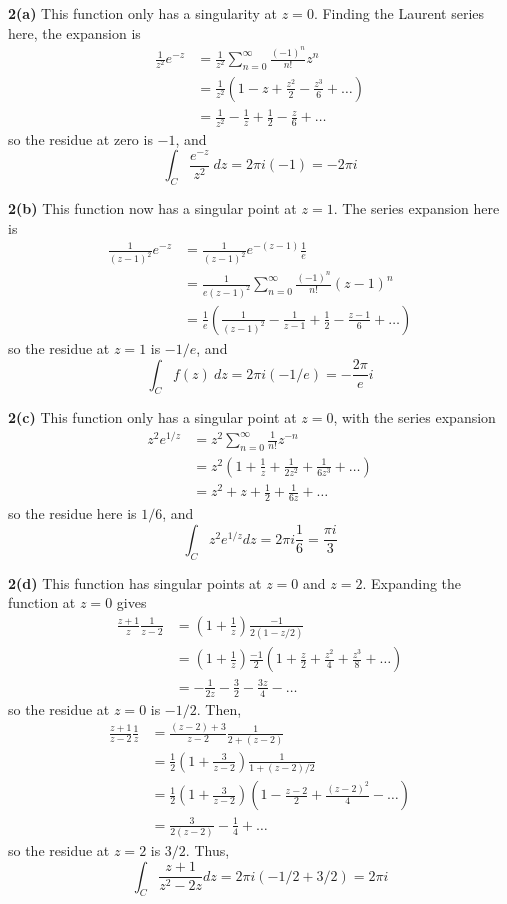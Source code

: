 \documentclass{article}
\begin{document}
\textbf{2(a)}
This function only has a singularity at $z = 0$. Finding the Laurent series here, the expansion is
\begin{align*}
	\frac{1}{z^2} e^{-z}
	&= \frac{1}{z^2} \sum_{n=0}^\infty \frac{(-1)^n}{n!} z^n \\
	&= \frac{1}{z^2} \left( 1 - z + \frac{z^2}{2} - \frac{z^3}{6} + \dots \right) \\
	&= \frac{1}{z^2} - \frac{1}{z} + \frac{1}{2} - \frac{z}{6} + \dots 
\end{align*}
so the residue at zero is $-1$, and
\[
	\int_C \frac{e^{-z}}{z^2}~dz = 2\pi i (-1) = -2\pi i
\]

\textbf{2(b)} 
This function now has a singular point at $z = 1$. The series expansion here is
\begin{align*}
	\frac{1}{(z - 1)^2} e^{-z}
	&= \frac{1}{(z - 1)^2} e^{-(z - 1)} \frac{1}{e} \\
	&= \frac{1}{e(z - 1)^2} \sum_{n=0}^\infty \frac{(-1)^n}{n!} (z - 1)^n \\
	&= \frac{1}{e} \left( \frac{1}{(z-1)^2} - \frac{1}{z-1} + \frac{1}{2} - \frac{z-1}{6} + \dots \right)
\end{align*}
so the residue at $z = 1$ is $-1/e$, and
\[
	\int_C f(z)~dz = 2\pi i (-1/e) = -\frac{2\pi}{e} i
\]

\textbf{2(c)}
This function only has a singular point at $z = 0$, with the series expansion
\begin{align*}
	z^2 e^{1/z}
	&= z^2 \sum_{n=0}^\infty \frac{1}{n!} z^{-n} \\
	&= z^2 \left(1 + \frac{1}{z} + \frac{1}{2z^2} + \frac{1}{6z^3} + \dots \right) \\
	&= z^2 + z + \frac{1}{2} + \frac{1}{6z} + \dots 
\end{align*}
so the residue here is $1/6$, and
\[
	\int_C z^2 e^{1/z} dz = 2\pi i \frac{1}{6} = \frac{\pi i}{3}
\]

\textbf{2(d)}
This function has singular points at $z = 0$ and $z = 2$. Expanding the function at $z = 0$ gives
\begin{align*}
	\frac{z + 1}{z} \frac{1}{z - 2}
	&= \left(1 + \frac{1}{z} \right) \frac{-1}{2(1 - z/2)} \\
	&= \left(1 + \frac{1}{z} \right) \frac{-1}{2} \left(1 + \frac{z}{2} + \frac{z^2}{4} + \frac{z^3}{8} + \dots\right) \\
	&= -\frac{1}{2z} - \frac{3}{2} - \frac{3z}{4} - \dots
\end{align*}
so the residue at $z = 0$ is $-1/2$. Then,
\begin{align*}
	\frac{z + 1}{z - 2} \frac{1}{z}
	&= \frac{(z - 2) + 3}{z - 2} \frac{1}{2 + (z - 2)} \\
	&= \frac{1}{2} \left(1 + \frac{3}{z - 2} \right) \frac{1}{1 + (z-2)/2} \\
	&= \frac{1}{2} \left(1 + \frac{3}{z - 2} \right) \left( 1 - \frac{z-2}{2} + \frac{(z-2)^2}{4} - \dots \right) \\
	&= \frac{3}{2 (z-2)} - \frac{1}{4} + \dots
\end{align*}
so the residue at $z = 2$ is $3/2$. Thus,
\[
	\int_C \frac{z + 1}{z^2 - 2z} dz = 2\pi i (-1/2 + 3/2) = 2\pi i
\]
\end{document}
